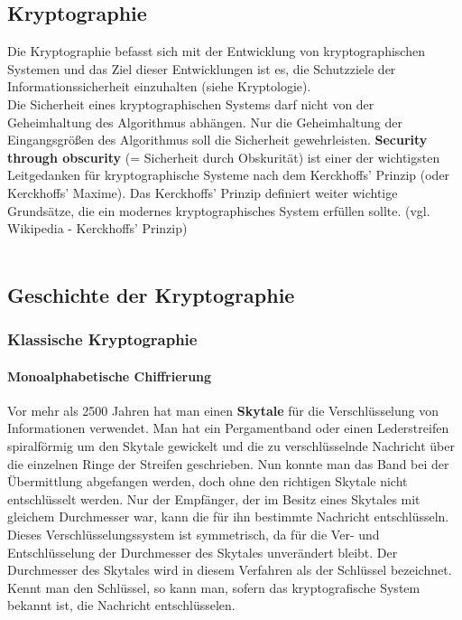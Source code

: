 \documentclass[12pt,a4paper]{report}
\begin{document}
\begin{onehalfspace}
\section{Kryptographie}

Die Kryptographie befasst sich mit der Entwicklung von kryptographischen Systemen und das Ziel dieser Entwicklungen ist es, die Schutzziele der Informationssicherheit einzuhalten (siehe Kryptologie). \\

Die Sicherheit eines kryptographischen Systems darf nicht von der Geheimhaltung des Algorithmus abhängen. Nur die Geheimhaltung der Eingangsgrößen des Algorithmus soll die Sicherheit gewehrleisten. \textbf{Security through obscurity} (= Sicherheit durch Obskurität) ist einer der wichtigsten Leitgedanken für kryptographische Systeme nach dem Kerckhoffs' Prinzip (oder Kerckhoffs' Maxime). Das Kerckhoffs' Prinzip definiert weiter wichtige Grundsätze, die ein modernes kryptographisches System erfüllen sollte. (vgl. Wikipedia - Kerckhoffs' Prinzip)\\\\

\subsection{Geschichte der Kryptographie}

\subsubsection{Klassische Kryptographie}

\paragraph{Monoalphabetische Chiffrierung}

Vor mehr als 2500 Jahren hat man einen \textbf{Skytale} für die Verschlüsselung von Informationen verwendet. Man hat ein Pergamentband oder einen Lederstreifen spiralförmig um den Skytale gewickelt und die zu verschlüsselnde Nachricht über die einzelnen Ringe der Streifen geschrieben. Nun konnte man das Band bei der Übermittlung abgefangen werden, doch ohne den richtigen Skytale nicht entschlüsselt werden. Nur der Empfänger, der im Besitz eines Skytales mit gleichem Durchmesser war, kann die für ihn bestimmte Nachricht entschlüsseln. Dieses Verschlüsselungssystem ist symmetrisch, da für die Ver- und Entschlüsselung der Durchmesser des Skytales unverändert bleibt. Der Durchmesser des Skytales wird in diesem Verfahren als der Schlüssel bezeichnet. Kennt man den Schlüssel, so kann man, sofern das kryptografische System bekannt ist, die Nachricht entschlüsselen. \cite{krypto01}\\\\


\end{onehalfspace}
\end{document}
